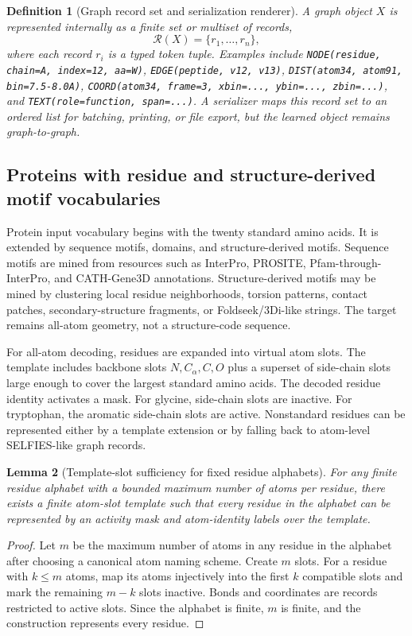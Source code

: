 \documentclass[11pt]{article}
\newtheorem{definition}{Definition}[section]
\newtheorem{lemma}[definition]{Lemma}
\newcommand{\1}{\mathbf{1}}
\begin{document}
\begin{definition}[Graph record set and serialization renderer]
A graph object $X$ is represented internally as a finite set or multiset of records,
\[
  \mathcal R(X)=\{r_1,\ldots,r_n\},
\]
where each record $r_i$ is a typed token tuple. Examples include \texttt{NODE(residue, chain=A, index=12, aa=W)}, \texttt{EDGE(peptide, v12, v13)}, \texttt{DIST(atom34, atom91, bin=7.5-8.0A)}, \texttt{COORD(atom34, frame=3, xbin=..., ybin=..., zbin=...)}, and \texttt{TEXT(role=function, span=...)}. A serializer maps this record set to an ordered list for batching, printing, or file export, but the learned object remains graph-to-graph.
\end{definition}

\subsection{Proteins with residue and structure-derived motif vocabularies}

Protein input vocabulary begins with the twenty standard amino acids. It is extended by sequence motifs, domains, and structure-derived motifs. Sequence motifs are mined from resources such as InterPro, PROSITE, Pfam-through-InterPro, and CATH-Gene3D annotations. Structure-derived motifs may be mined by clustering local residue neighborhoods, torsion patterns, contact patches, secondary-structure fragments, or Foldseek/3Di-like strings. The target remains all-atom geometry, not a structure-code sequence.

For all-atom decoding, residues are expanded into virtual atom slots. The template includes backbone slots $N,C_\alpha,C,O$ plus a superset of side-chain slots large enough to cover the largest standard amino acids. The decoded residue identity activates a mask. For glycine, side-chain slots are inactive. For tryptophan, the aromatic side-chain slots are active. Nonstandard residues can be represented either by a template extension or by falling back to atom-level SELFIES-like graph records.

\begin{lemma}[Template-slot sufficiency for fixed residue alphabets]
For any finite residue alphabet with a bounded maximum number of atoms per residue, there exists a finite atom-slot template such that every residue in the alphabet can be represented by an activity mask and atom-identity labels over the template.
\end{lemma}
\begin{proof}
Let $m$ be the maximum number of atoms in any residue in the alphabet after choosing a canonical atom naming scheme. Create $m$ slots. For a residue with $k\leq m$ atoms, map its atoms injectively into the first $k$ compatible slots and mark the remaining $m-k$ slots inactive. Bonds and coordinates are records restricted to active slots. Since the alphabet is finite, $m$ is finite, and the construction represents every residue.\end{proof}
\end{document}
